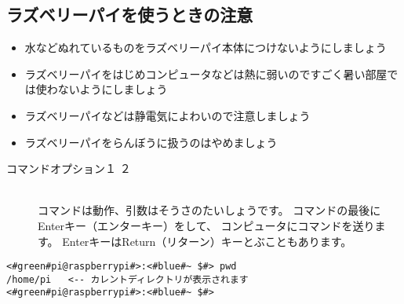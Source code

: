 \subsection{ラズベリーパイを使うときの注意}
\begin{itemize}
  \item 水などぬれているものをラズベリーパイ本体につけないようにしましょう
  \item ラズベリーパイをはじめコンピュータなどは熱に弱いのですごく暑い部屋では使わないようにしましょう
  \item ラズベリーパイなどは静電気によわいので注意しましょう
  \item ラズベリーパイをらんぼうに扱うのはやめましょう
\end{itemize}
\clearpage










\begin{description}
\item[コマンド\textvisiblespace オプション\textvisiblespace {}１\textvisiblespace 
{}２]\mbox{}\\
 コマンドは動作、引数はそうさのたいしょうです。
 コマンドの最後にEnterキー（エンターキー）をして、
 コンピュータにコマンドを送ります。
 EnterキーはReturn（リターン）キーとぶこともあります。
\end{description}



\begin{lstlisting}[caption=pwdコマンドの例,label=pwdtest]
<#green#pi@raspberrypi#>:<#blue#~ $#> pwd
/home/pi   <-- カレントディレクトリが表示されます
<#green#pi@raspberrypi#>:<#blue#~ $#>
\end{lstlisting}

\begin{tcolorbox}[title=\useOmetoi]
\begin{enumerate}
\end{enumerate}
\end{tcolorbox}

